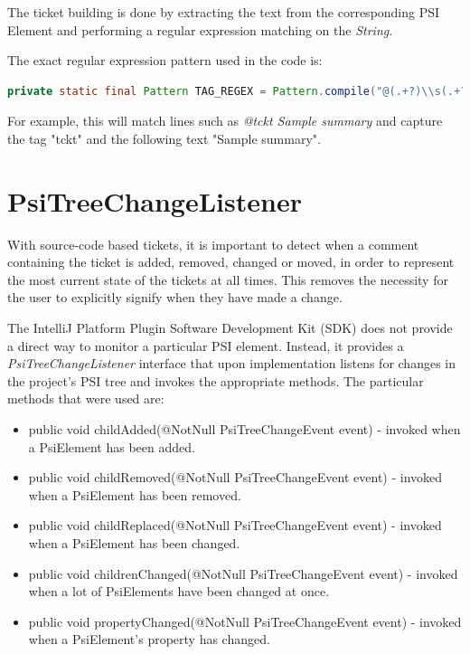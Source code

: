 \documentclass{4thYearProject}
\begin{document}
The ticket building is done by extracting the text from the corresponding PSI Element and performing a regular expression matching on the \textit{String}.

The exact regular expression pattern used in the code is:
\begin{lstlisting}[language=Java, basicstyle=\footnotesize\tt,        % the size of the fonts that are used for the code
  frame=single,                    % adds a frame around the code
  language=Java,                 % the language of the code
  keywordstyle=\bf]
 private static final Pattern TAG_REGEX = Pattern.compile("@(.+?)\\s(.+?)\\n");
\end{lstlisting}

For example, this will match lines such as \textit{@tckt Sample summary} and capture the tag "tckt" and the following text "Sample summary". 

\section{PsiTreeChangeListener}

With source-code based tickets, it is important to detect when a comment containing the ticket is added, removed, changed or moved, in order to represent the most current state of the tickets at all times. This removes the necessity for the user to explicitly signify when they have made a change.

The IntelliJ Platform Plugin Software Development Kit (SDK) does not provide a direct way to monitor a particular PSI element. Instead, it provides a \textit{PsiTreeChangeListener} interface that upon implementation listens for changes in the project's PSI tree and invokes the appropriate methods. The particular methods that were used are:

\begin{itemize}
\item public void childAdded(@NotNull PsiTreeChangeEvent event) - invoked when a PsiElement has been added.
\item public void childRemoved(@NotNull PsiTreeChangeEvent event) - invoked when a PsiElement has been removed.
\item public void childReplaced(@NotNull PsiTreeChangeEvent event) - invoked when a PsiElement has been changed.
\item public void childrenChanged(@NotNull PsiTreeChangeEvent event) - invoked when a lot of PsiElements have been changed at once.
\item public void propertyChanged(@NotNull PsiTreeChangeEvent event) - invoked when a PsiElement's property has changed.

\end{itemize}
\end{document}
